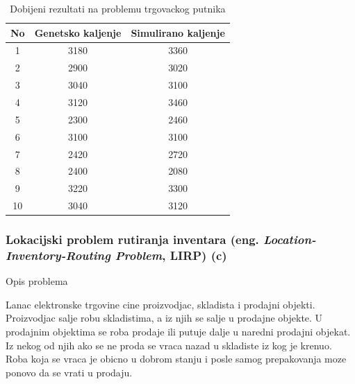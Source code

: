 \documentclass[a4paper]{article}
\begin{document}
\newpage
\begin{table}[ht]
\begin{center}
\begin{tabular}{|c|c|c|} \hline
     No & Genetsko kaljenje & Simulirano kaljenje  \\ \hline
     1 &  3180 & 3360 \\ \hline
     2 &  2900 & 3020 \\ \hline
     3 &  3040 & 3100 \\ \hline
     4 &  3120 & 3460 \\ \hline
     5 &  2300 & 2460 \\ \hline
     6 &  3100 & 3100 \\ \hline
     7 &  2420 & 2720 \\ \hline
     8 &  2400 & 2080 \\ \hline
     9 &  3220 & 3300 \\ \hline
     10 & 3040 & 3120 \\ \hline
\end{tabular}
\end{center}
\label{tabela:1}
\caption{Dobijeni rezultati na problemu trgovackog putnika}
\end{table}

\subsubsection{Lokacijski problem rutiranja inventara (eng. \textit{Location-Inventory-Routing Problem}, LIRP) (c)}

\large{Opis problema}  \normalsize

Lanac elektronske trgovine cine proizvodjac, skladista i prodajni objekti. Proizvodjac salje robu skladistima, a iz njih se salje u prodajne objekte. U prodajnim objektima se roba prodaje ili putuje dalje u naredni prodajni objekat. Iz nekog od njih ako se ne proda se vraca nazad u skladiste iz kog je krenuo. Roba koja se vraca je obicno u dobrom stanju i posle samog prepakovanja moze ponovo da se vrati u prodaju. 
\end{document}
